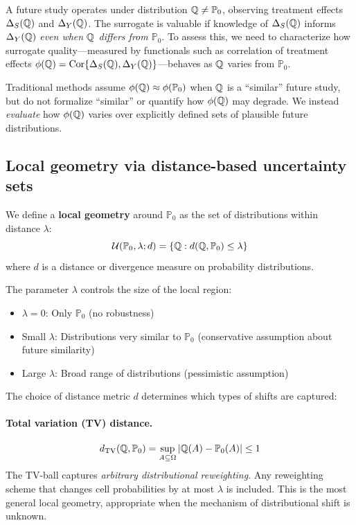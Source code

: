 \documentclass{article}
\newcommand{\PP}{\mathbb{P}}
\begin{document}
A future study operates under distribution $\Q \neq \PP_0$, observing treatment effects $\Delta_S(\mathbb{Q})$ and $\Delta_Y(\mathbb{Q})$. The surrogate is valuable if knowledge of $\Delta_S(\mathbb{Q})$ informs $\Delta_Y(\mathbb{Q})$ \emph{even when $\mathbb{Q}$ differs from $\PP_0$}. To assess this, we need to characterize how surrogate quality---measured by functionals such as correlation of treatment effects $\phi(\mathbb{Q}) = \text{Cor}\{\Delta_S(\mathbb{Q}), \Delta_Y(\mathbb{Q})\}$---behaves as $\mathbb{Q}$ varies from $\PP_0$.

Traditional methods assume $\phi(\Q) \approx \phi(\PP_0)$ when $\mathbb{Q}$ is a ``similar'' future study, but do not formalize ``similar'' or quantify how $\phi(\mathbb{Q})$ may degrade. We instead \emph{evaluate} how $\phi(\mathbb{Q})$ varies over explicitly defined sets of plausible future distributions.

\subsection{Local geometry via distance-based uncertainty sets}

We define a \textbf{local geometry} around $\PP_0$ as the set of distributions within distance $\lambda$:
\begin{equation}\label{eq:local-geometry}
    \cU(\PP_0, \lambda; d) = \{\Q : d(\Q, \PP_0) \leq \lambda\}
\end{equation}
where $d$ is a distance or divergence measure on probability distributions.

The parameter $\lambda$ controls the size of the local region:
\begin{itemize}
    \item $\lambda = 0$: Only $\PP_0$ (no robustness)
    \item Small $\lambda$: Distributions very similar to $\PP_0$ (conservative assumption about future similarity)
    \item Large $\lambda$: Broad range of distributions (pessimistic assumption)
\end{itemize}

The choice of distance metric $d$ determines which types of shifts are captured:

\paragraph{Total variation (TV) distance.}
\begin{equation}
    d_{\mathrm{TV}}(\Q, \PP_0) = \sup_{A \subseteq \Omega} |\Q(A) - \PP_0(A)| \leq 1
\end{equation}
The TV-ball captures \emph{arbitrary distributional reweighting}. Any reweighting scheme that changes cell probabilities by at most $\lambda$ is included. This is the most general local geometry, appropriate when the mechanism of distributional shift is unknown.
\end{document}

